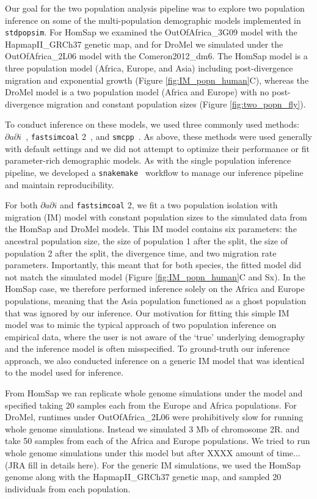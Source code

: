 \documentclass[12pt,halfline,a4paper]{ouparticle}
\newcommand{\stdpopsim}{\texttt{stdpopsim}\xspace}
\newcommand{\dadi}{$\partial a \partial i$\xspace}
\newcommand{\smcpp}{\texttt{smcpp}\xspace}
\newcommand{\fastsimcoal}{\texttt{fastsimcoal}\xspace}
\begin{document}
Our goal for the two population analysis pipeline was to explore two population inference
on some of the multi-population demographic models implemented in \stdpopsim.
For HomSap we examined the OutOfAfrica\_3G09 model with the HapmapII\_GRCh37 genetic map,
and for DroMel we simulated under the OutOfAfrica\_2L06 model with the Comeron2012\_dm6.
The HomSap model is a three population model (Africa, Europe, and Asia) including post-divergence
migration and exponential growth (Figure \ref{fig:IM_popn_human}C), whereas the
DroMel model is a two population model (Africa and Europe) with no post-divergence
migration and constant population sizes (Figure \ref{fig:two_popn_fly}).

To conduct inference on these models, we used three commonly used methods:
\dadi~\citep{gutenkunst2009inferring}, \fastsimcoal2~\citep{excoffier2013robust},
and \smcpp~\citep{terhorst2017robust}. As above, these methods were used
generally with default settings and we did not attempt to optimize their performance or fit
parameter-rich demographic models. As with the single population inference pipeline,
we developed a \texttt{snakemake}~\citep{koster2012snakemake} workflow to manage
our inference pipeline and maintain reproducibility.

For both \dadi and \fastsimcoal2, we fit a two population
isolation with migration (IM) model with constant population sizes to the simulated
data from the HomSap and DroMel models. This IM model contains six parameters:
the ancestral population size, the size of population 1 after the split, the size of
population 2 after the split, the divergence time, and two migration rate parameters.
Importantly, this meant that for both species, the
fitted model did not match the simulated model (Figure \ref{fig:IM_popn_human}C and Sx).
In the HomSap case, we therefore performed inference solely on the Africa
and Europe populations, meaning that the Asia population functioned as a ghost
population that was ignored by our inference. Our motivation for fitting this simple
IM model was to mimic the typical approach of two population inference on empirical
data, where the user is not aware of the `true' underlying demography and the inference
model is often misspecified. To ground-truth our inference approach, we also conducted
inference on a generic IM model that was identical to the model used for inference.

From HomSap we ran replicate whole genome simulations under the model
and specified taking 20 samples each from the Europe and Africa populations. 
For DroMel, runtimes under OutOfAfrica\_2L06 were prohibitively slow for
running whole genome simulations. Instead we simulated 3 Mb of chromosome 2R.
and take 50 samples from each of
the Africa and Europe populations. We tried to run whole genome simulations under
this model but after XXXX amount of time... (JRA fill in details here). For the generic
IM simulations, we used the HomSap genome along with the HapmapII\_GRCh37 genetic map,
and sampled 20 individuals from each population.
\end{document}
